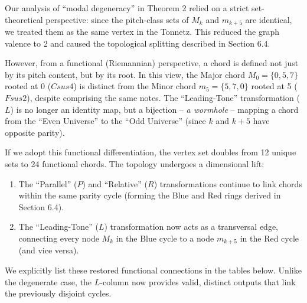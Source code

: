 \documentclass[12pt,letterpaper]{amsart}
\begin{document}
Our analysis of ``modal degeneracy'' in Theorem 2 relied on a strict set-theoretical perspective: since the pitch-class sets of $M_k$ and $m_{k+5}$ are identical, we treated them as the same vertex in the Tonnetz. This reduced the graph valence to 2 and caused the topological splitting described in Section 6.4.

However, from a functional (Riemannian) perspective, a chord is defined not just by its pitch content, but by its root. In this view, the Major chord $M_0 = \{0, 5, 7\}$ rooted at 0 ($Csus4$) is distinct from the Minor chord $m_5 = \{5, 7, 0\}$ rooted at 5 ($Fsus2$), despite comprising the same notes. The ``Leading-Tone'' transformation ($L$) is no longer an identity map, but a bijection -- \emph{a wormhole} -- mapping a chord from the ``Even Universe'' to the ``Odd Universe'' (since $k$ and $k+5$ have opposite parity).

If we adopt this functional differentiation, the vertex set doubles from 12 unique sets to 24 functional chords. The topology undergoes a dimensional lift:
\begin{enumerate}
    \item The ``Parallel'' ($P$) and ``Relative'' ($R$) transformations continue to link chords within the same parity cycle (forming the Blue and Red rings derived in Section 6.4).
    \item The ``Leading-Tone'' ($L$) transformation now acts as a transversal edge, connecting every node $M_k$ in the Blue cycle to a node $m_{k+5}$ in the Red cycle (and vice versa).
\end{enumerate}

We explicitly list these restored functional connections in the tables below. Unlike the degenerate case, the $L$-column now provides valid, distinct outputs that link the previously disjoint cycles.
\end{document}
